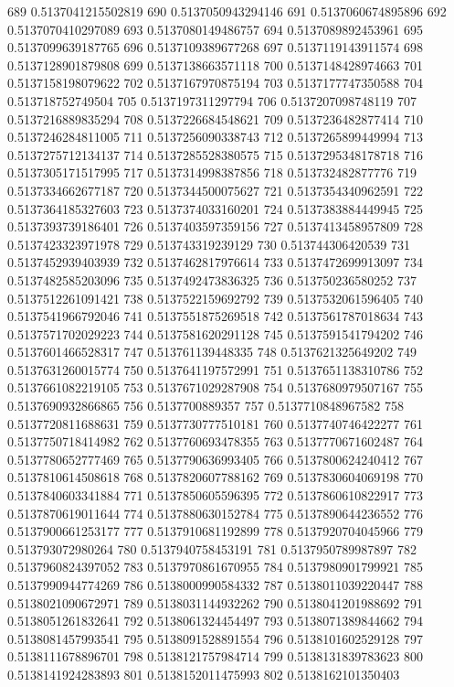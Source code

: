 689 0.5137041215502819
690 0.5137050943294146
691 0.5137060674895896
692 0.5137070410297089
693 0.5137080149486757
694 0.5137089892453961
695 0.5137099639187765
696 0.5137109389677268
697 0.5137119143911574
698 0.5137128901879808
699 0.5137138663571118
700 0.5137148428974663
701 0.5137158198079622
702 0.5137167970875194
703 0.5137177747350588
704 0.513718752749504
705 0.5137197311297794
706 0.5137207098748119
707 0.5137216889835294
708 0.5137226684548621
709 0.5137236482877414
710 0.5137246284811005
711 0.5137256090338743
712 0.5137265899449994
713 0.5137275712134137
714 0.5137285528380575
715 0.5137295348178718
716 0.5137305171517995
717 0.5137314998387856
718 0.513732482877776
719 0.5137334662677187
720 0.5137344500075627
721 0.5137354340962591
722 0.5137364185327603
723 0.5137374033160201
724 0.5137383884449945
725 0.5137393739186401
726 0.5137403597359156
727 0.5137413458957809
728 0.5137423323971978
729 0.513743319239129
730 0.513744306420539
731 0.5137452939403939
732 0.5137462817976614
733 0.5137472699913097
734 0.5137482585203096
735 0.5137492473836325
736 0.513750236580252
737 0.5137512261091421
738 0.5137522159692792
739 0.5137532061596405
740 0.5137541966792046
741 0.5137551875269518
742 0.5137561787018634
743 0.5137571702029223
744 0.5137581620291128
745 0.5137591541794202
746 0.5137601466528317
747 0.513761139448335
748 0.5137621325649202
749 0.5137631260015774
750 0.5137641197572991
751 0.5137651138310786
752 0.5137661082219105
753 0.5137671029287908
754 0.5137680979507167
755 0.5137690932866865
756 0.5137700889357
757 0.5137710848967582
758 0.5137720811688631
759 0.5137730777510181
760 0.5137740746422277
761 0.5137750718414982
762 0.5137760693478355
763 0.5137770671602487
764 0.5137780652777469
765 0.5137790636993405
766 0.5137800624240412
767 0.5137810614508618
768 0.5137820607788162
769 0.5137830604069198
770 0.5137840603341884
771 0.5137850605596395
772 0.5137860610822917
773 0.5137870619011644
774 0.5137880630152784
775 0.5137890644236552
776 0.5137900661253177
777 0.5137910681192899
778 0.5137920704045966
779 0.513793072980264
780 0.5137940758453191
781 0.5137950789987897
782 0.5137960824397052
783 0.5137970861670955
784 0.5137980901799921
785 0.5137990944774269
786 0.5138000990584332
787 0.5138011039220447
788 0.5138021090672971
789 0.5138031144932262
790 0.5138041201988692
791 0.5138051261832641
792 0.5138061324454497
793 0.5138071389844662
794 0.5138081457993541
795 0.5138091528891554
796 0.5138101602529128
797 0.5138111678896701
798 0.5138121757984714
799 0.5138131839783623
800 0.5138141924283893
801 0.5138152011475993
802 0.5138162101350403
